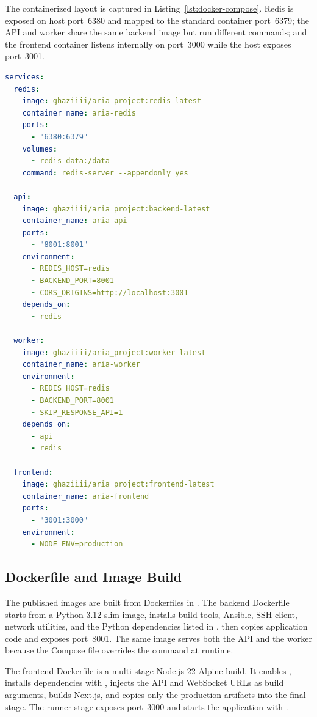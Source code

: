The containerized layout is captured in Listing~\ref{lst:docker-compose}. Redis is exposed on host port~6380 and mapped to the standard container port~6379; the API and worker share the same backend image but run different commands; and the frontend container listens internally on port~3000 while the host exposes port~3001.

\begin{lstlisting}[style=aria,language=yaml,caption={Docker Compose services excerpt},label={lst:docker-compose},
  emph={services,redis,api,worker,frontend,image,container_name,ports,volumes,environment,depends_on,restart,command},
  emphstyle=\color{codekw}\bfseries]
services:
  redis:
    image: ghaziiii/aria_project:redis-latest
    container_name: aria-redis
    ports:
      - "6380:6379"
    volumes:
      - redis-data:/data
    command: redis-server --appendonly yes

  api:
    image: ghaziiii/aria_project:backend-latest
    container_name: aria-api
    ports:
      - "8001:8001"
    environment:
      - REDIS_HOST=redis
      - BACKEND_PORT=8001
      - CORS_ORIGINS=http://localhost:3001
    depends_on:
      - redis

  worker:
    image: ghaziiii/aria_project:worker-latest
    container_name: aria-worker
    environment:
      - REDIS_HOST=redis
      - BACKEND_PORT=8001
      - SKIP_RESPONSE_API=1
    depends_on:
      - api
      - redis

  frontend:
    image: ghaziiii/aria_project:frontend-latest
    container_name: aria-frontend
    ports:
      - "3001:3000"
    environment:
      - NODE_ENV=production
\end{lstlisting}

\subsection{Dockerfile and Image Build}

The published images are built from Dockerfiles in . The backend Dockerfile starts from a Python 3.12 slim image, installs build tools, Ansible, SSH client, network utilities, and the Python dependencies listed in , then copies application code and exposes port~8001. The same image serves both the API and the worker because the Compose file overrides the command at runtime.

The frontend Dockerfile is a multi-stage Node.js 22 Alpine build. It enables , installs dependencies with , injects the API and WebSocket URLs as build arguments, builds Next.js, and copies only the production artifacts into the final stage. The runner stage exposes port~3000 and starts the application with .

